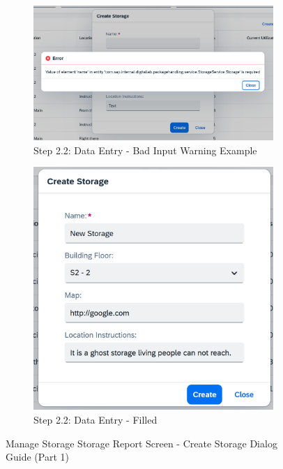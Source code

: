 \begin{figure}[!htb]
    \begin{subfigure}{0.45\linewidth}
        \includegraphics[width=\linewidth]{images/user_doc/storage/StorageReportPage/csdlgBadInput.png}
        \caption{Step 2.2: Data Entry - Bad Input Warning Example}
    \end{subfigure}
    \hspace{5pt}
    \begin{subfigure}{0.45\linewidth}
        \includegraphics[width=\linewidth]{images/user_doc/storage/StorageReportPage/csdlgFilled.png}
        \caption{Step 2.2: Data Entry - Filled}
    \end{subfigure}

    
    \caption{Manage Storage Storage Report Screen - Create Storage Dialog Guide (Part 1)}
    \label{fig:MSreportCreateGuide1}
\end{figure}

